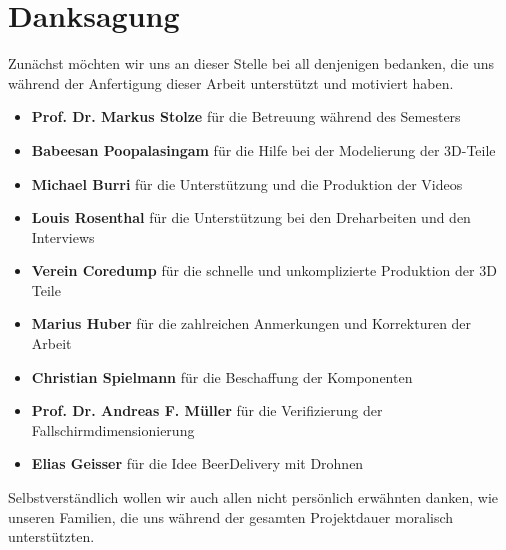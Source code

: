 \newpage
{}
\chapter*{Danksagung}
Zunächst möchten wir uns an dieser Stelle bei all denjenigen bedanken, die uns während der Anfertigung dieser Arbeit unterstützt und motiviert haben.
\begin{itemize}
	\item{\textbf{Prof. Dr. Markus Stolze} für die Betreuung während des Semesters}
	\item{\textbf{Babeesan Poopalasingam} für die Hilfe bei der Modelierung der 3D-Teile}
	\item{\textbf{Michael Burri} für die Unterstützung und die Produktion der Videos}
	\item{\textbf{Louis Rosenthal} für die Unterstützung bei den Dreharbeiten und den Interviews}
	\item{\textbf{Verein Coredump} für die schnelle und unkomplizierte Produktion der 3D Teile}
	\item{\textbf{Marius Huber} für die zahlreichen Anmerkungen und Korrekturen  der Arbeit}
    \item{\textbf{Christian Spielmann} für die Beschaffung der Komponenten}
	\item{\textbf{Prof. Dr. Andreas F. Müller} für die Verifizierung der Fallschirmdimensionierung}
	\item{\textbf{Elias Geisser} für die Idee BeerDelivery mit Drohnen}	
\end{itemize}
Selbstverständlich wollen wir auch allen nicht persönlich erwähnten danken, wie unseren Familien, die uns während der gesamten Projektdauer moralisch unterstützten.